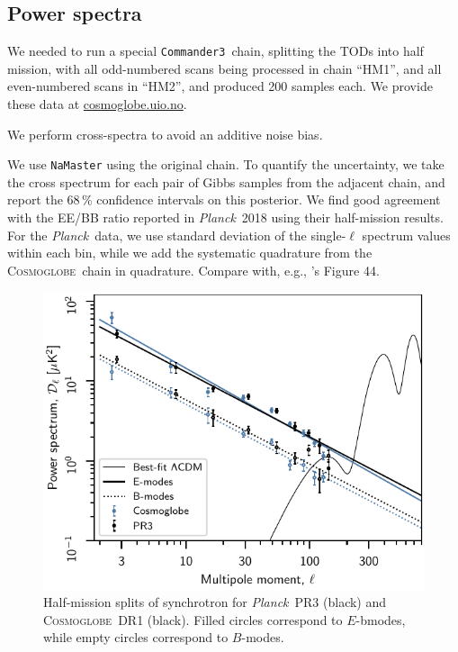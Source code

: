 \documentclass[twocolumn]{../../common/aa}
\def\Planck{\emph{Planck}}
\def\commanderthree{\texttt{Commander3}}
\newcommand{\cosmoglobe}{\textsc{Cosmoglobe}}
\begin{document}
\subsection{Power spectra}

We needed to run a special \commanderthree\ chain, splitting the TODs into half mission, with all odd-numbered scans being processed in chain ``HM1'', and all even-numbered scans in ``HM2'', and produced 200 samples each. We provide these data at \url{cosmoglobe.uio.no}.

We perform cross-spectra to avoid an additive noise bias.

We use \texttt{NaMaster} using the original chain. To quantify the uncertainty, we take the cross spectrum for each pair of Gibbs samples from the adjacent chain, and report the 68\,\% confidence intervals on this posterior. We find good agreement with the EE/BB ratio reported in \Planck\ 2018 using their half-mission results. For the \Planck\ data, we use standard deviation of the single-$\ell$ spectrum values within each bin, while we add the systematic quadrature from the \cosmoglobe\ chain in quadrature. Compare with, e.g., \citet{planck2014-a12}'s Figure 44.

\begin{figure}
        \centering
	\includegraphics[width=\linewidth]{figures/cls_synch_ratio.pdf}
        \caption{
		Half-mission splits of synchrotron for \Planck\ PR3 (black) and \cosmoglobe\ DR1 (black). Filled circles correspond to $E$-bmodes, while empty circles correspond to $B$-modes.
        }
        \label{fig:regions}

\end{figure}
\end{document}
